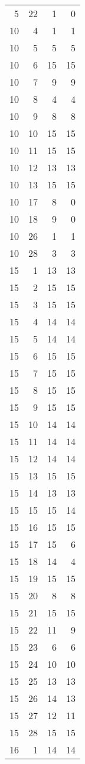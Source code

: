 \documentclass[
]{article}
\begin{document}
\begin{longtable}[]{@{}rrrr@{}}
5 & 22 & 1 & 0 \\
10 & 4 & 1 & 1 \\
10 & 5 & 5 & 5 \\
10 & 6 & 15 & 15 \\
10 & 7 & 9 & 9 \\
10 & 8 & 4 & 4 \\
10 & 9 & 8 & 8 \\
10 & 10 & 15 & 15 \\
10 & 11 & 15 & 15 \\
10 & 12 & 13 & 13 \\
10 & 13 & 15 & 15 \\
10 & 17 & 8 & 0 \\
10 & 18 & 9 & 0 \\
10 & 26 & 1 & 1 \\
10 & 28 & 3 & 3 \\
15 & 1 & 13 & 13 \\
15 & 2 & 15 & 15 \\
15 & 3 & 15 & 15 \\
15 & 4 & 14 & 14 \\
15 & 5 & 14 & 14 \\
15 & 6 & 15 & 15 \\
15 & 7 & 15 & 15 \\
15 & 8 & 15 & 15 \\
15 & 9 & 15 & 15 \\
15 & 10 & 14 & 14 \\
15 & 11 & 14 & 14 \\
15 & 12 & 14 & 14 \\
15 & 13 & 15 & 15 \\
15 & 14 & 13 & 13 \\
15 & 15 & 15 & 14 \\
15 & 16 & 15 & 15 \\
15 & 17 & 15 & 6 \\
15 & 18 & 14 & 4 \\
15 & 19 & 15 & 15 \\
15 & 20 & 8 & 8 \\
15 & 21 & 15 & 15 \\
15 & 22 & 11 & 9 \\
15 & 23 & 6 & 6 \\
15 & 24 & 10 & 10 \\
15 & 25 & 13 & 13 \\
15 & 26 & 14 & 13 \\
15 & 27 & 12 & 11 \\
15 & 28 & 15 & 15 \\
16 & 1 & 14 & 14 \\

\end{longtable}
\end{document}

